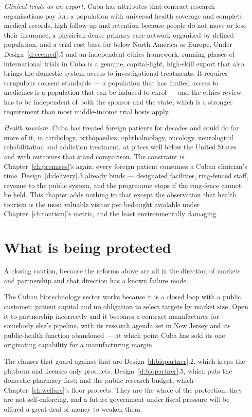 \emph{Clinical trials as an export.} Cuba has attributes that contract research
organisations pay for: a population with universal health coverage and complete
medical records, high follow-up and retention because people do not move or lose
their insurance, a physician-dense primary care network organised by defined
population, and a trial cost base far below North America or Europe. Under
Design~\ref{d:cecmed}.5 and an independent ethics framework, running phases of
international trials in Cuba is a genuine, capital-light, high-skill export that
also brings the domestic system access to investigational treatments. It requires
scrupulous consent standards --- a population that has limited access to medicines
is a population that can be induced to enrol --- and the ethics review has to be
independent of both the sponsor and the state, which is a stronger requirement
than most middle-income trial hosts apply.

\emph{Health tourism.} Cuba has treated foreign patients for decades and could
do far more of it, in cardiology, orthopaedics, ophthalmology, oncology,
neurological rehabilitation and addiction treatment, at prices well below the
United States and with outcomes that stand comparison. The constraint is
Chapter~\ref{ch:premises}'s again: every foreign patient consumes a Cuban
clinician's time. Design~\ref{d:delivery}.3 already binds --- designated
facilities, ring-fenced staff, revenue to the public system, and the programme
stops if the ring-fence cannot be held. This chapter adds nothing to that except
the observation that health tourism is the most valuable visitor per bed-night
available under Chapter~\ref{ch:tourism}'s metric, and the least environmentally
damaging.

\section{What is being protected}

A closing caution, because the reforms above are all in the direction of markets
and partnership and that direction has a known failure mode.

The Cuban biotechnology sector works because it is a closed loop with a public
customer, patient capital and no obligation to select targets by market size. Open
it to partnership incorrectly and it becomes a contract manufacturer for
somebody else's pipeline, with its research agenda set in New Jersey and its
public-health function abandoned --- at which point Cuba has sold its one
originating capability for a manufacturing margin.

The clauses that guard against that are Design~\ref{d:biopartner}.2, which keeps
the platform and licenses only products; Design~\ref{d:biopartner}.5, which puts
the domestic pharmacy first; and the public research budget, which
Chapter~\ref{ch:welfare}'s floor protects. They are the whole of the protection,
they are not self-enforcing, and a future government under fiscal pressure will
be offered a great deal of money to weaken them.
